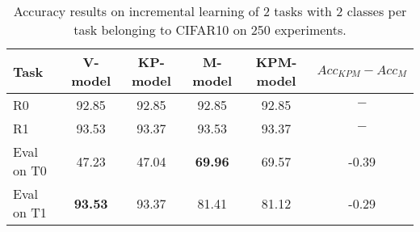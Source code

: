\begin{table}[H]
\centering
\begin{tabular}{lccccc}
\toprule
Task  & V-model & KP-model & M-model & KPM-model & $Acc_{KPM}-Acc_{M}$ \\
\midrule
R0 & 92.85 & 92.85 & 92.85 & 92.85 & $-$ \\
R1 & 93.53 & 93.37 & 93.53 & 93.37 & $-$ \\

 \hline 
Eval on T0 & 47.23 & 47.04 & \textbf{69.96} & 69.57 & -0.39 \\
Eval on T1 & \textbf{93.53} & 93.37 & 81.41 & 81.12 & -0.29 \\
\bottomrule
\end{tabular}
\caption{Accuracy results on incremental learning of 2 tasks with 2 classes per task belonging to CIFAR10 on 250 experiments.}
\end{table}
